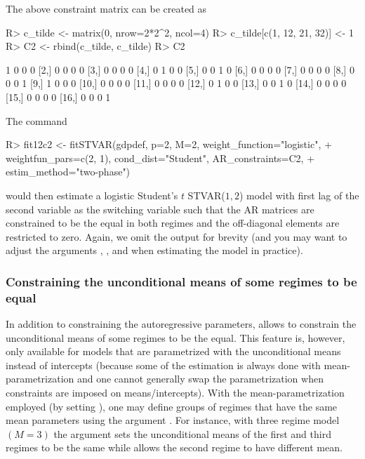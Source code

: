 \documentclass[nojss]{jss}
\begin{document}
The above constraint matrix can be created as
%
\begin{CodeChunk}
\begin{CodeInput}
R> c_tilde <- matrix(0, nrow=2*2^2, ncol=4)
R> c_tilde[c(1, 12, 21, 32)] <- 1
R> C2 <- rbind(c_tilde, c_tilde)
R> C2
\end{CodeInput}
\begin{CodeOutput}
      [,1] [,2] [,3] [,4]
 [1,]    1    0    0    0
 [2,]    0    0    0    0
 [3,]    0    0    0    0
 [4,]    0    1    0    0
 [5,]    0    0    1    0
 [6,]    0    0    0    0
 [7,]    0    0    0    0
 [8,]    0    0    0    1
 [9,]    1    0    0    0
[10,]    0    0    0    0
[11,]    0    0    0    0
[12,]    0    1    0    0
[13,]    0    0    1    0
[14,]    0    0    0    0
[15,]    0    0    0    0
[16,]    0    0    0    1
\end{CodeOutput}
\end{CodeChunk}
%
The command
\begin{CodeChunk}
\begin{CodeInput}
R> fit12c2 <- fitSTVAR(gdpdef, p=2, M=2, weight_function="logistic",
+    weightfun_pars=c(2, 1), cond_dist="Student", AR_constraints=C2,
+    estim_method="two-phase")
\end{CodeInput}
\end{CodeChunk}
would then estimate a logistic Student's $t$ STVAR($1,2$) model with first lag of the second variable as the switching variable such that the AR matrices are constrained to be the equal in both regimes and the off-diagonal elements are restricted to zero. Again, we omit the output for brevity (and you may want to adjust the arguments , , and  when estimating the model in practice).


\subsubsection{Constraining the unconditional means of some regimes to be equal}

In addition to constraining the autoregressive parameters,  allows to constrain the unconditional means of some regimes to be the equal. This feature is, however, only available for models that are parametrized with the unconditional means instead of intercepts (because some of the estimation is always done with mean-parametrization and one cannot generally swap the parametrization when constraints are imposed on means/intercepts). With the mean-parametrization employed (by setting ), one may define groups of regimes that have the same mean parameters using the argument . For instance, with three regime model $(M=3)$ the argument  sets the unconditional means of the first and third regimes to be the same while allows the second regime to have different mean.
\end{document}
